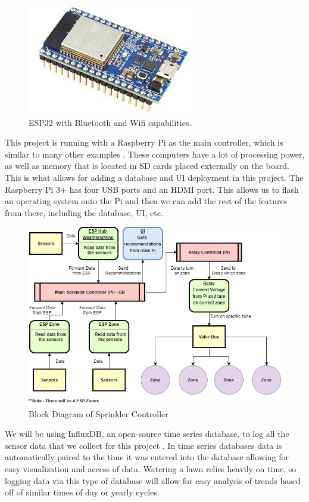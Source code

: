 \documentclass[letterpaper, 10 pt, conference]{ieeeconf}  %
\begin{document}
\begin{figure}[H]
    \centering
    \includegraphics[scale=.5]{ESP32.jpg}
    \caption{ESP32 with Bluetooth and Wifi capabilities.}
    \label{fig:esp_label}
\end{figure}

This project is running with a Raspberry Pi as the main controller, which is similar to many other examples \cite{SIP}. These computers have a lot of processing power, as well as memory that is located in SD cards placed externally on the board. This is what allows for adding a database and UI deployment in this project. The Raspberry Pi 3+ has four USB ports and an HDMI port. This allows us to flash an operating system onto the Pi and then we can add the rest of the features from there, including the database, UI, etc. 

\begin{figure}
	\centering
	\includegraphics[width=\textwidth]{Diagram.png}
	\caption{Block Diagram of Sprinkler Controller}
	\label{label1}
\end{figure}

We will be using InfluxDB, an open-source time series database, to log all the sensor data that we collect for this project \cite{influxdb}. In time series databases data is automatically paired to the time it was entered into the database allowing for easy visualization and access of data. Watering a lawn relies heavily on time, so logging data via this type of database will allow for easy analysis of trends based off of similar times of day or yearly cycles.
\end{document}
